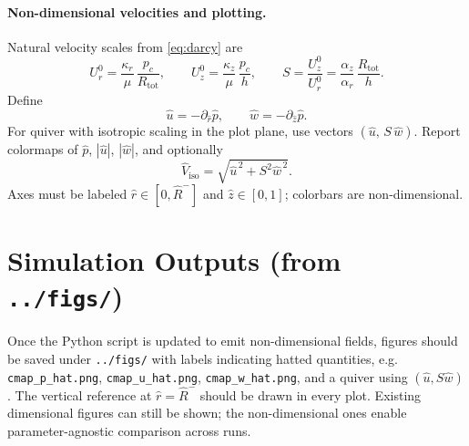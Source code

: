 \documentclass[11pt,a4paper]{article}
\begin{document}
\paragraph{Non-dimensional velocities and plotting.}
Natural velocity scales from \eqref{eq:darcy} are
\begin{equation}
  U_r^0=\frac{\kappa_r}{\mu}\,\frac{p_c}{R_{\text{tot}}},\qquad
  U_z^0=\frac{\kappa_z}{\mu}\,\frac{p_c}{h},\qquad
  S=\frac{U_z^0}{U_r^0}=\frac{\alpha_z}{\alpha_r}\,\frac{R_{\text{tot}}}{h}.
  \label{eq:U_scales}
\end{equation}
Define
\begin{equation}
  \hat u=-\partial_{\hat r}\hat p,\qquad
  \hat w=-\partial_{\hat z}\hat p.
  \label{eq:vel_hat}
\end{equation}
For quiver with isotropic scaling in the plot plane, use vectors $(\hat u,\,S\,\hat w)$.
Report colormaps of $\hat p$, $|\hat u|$, $|\hat w|$, and optionally
\begin{equation}
  \hat V_{\mathrm{iso}}=\sqrt{\hat u^{\,2}+S^{2}\hat w^{\,2}}.
\end{equation}
Axes must be labeled $\hat r\in[0,\hat R^-]$ and $\hat z\in[0,1]$; colorbars are non-dimensional.

\section{Simulation Outputs (from \texttt{../figs/})}
Once the Python script is updated to emit non-dimensional fields, figures should be saved under \texttt{../figs/} with labels indicating hatted quantities, e.g. \texttt{cmap\_p\_hat.png}, \texttt{cmap\_u\_hat.png}, \texttt{cmap\_w\_hat.png}, and a quiver using $(\hat u,S\hat w)$.
The vertical reference at $\hat r=\hat R^-$ should be drawn in every plot.
Existing dimensional figures can still be shown; the non-dimensional ones enable parameter-agnostic comparison across runs.
\end{document}
